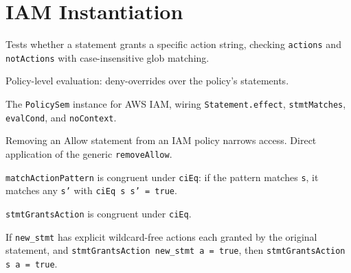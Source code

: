\section{IAM Instantiation}

\begin{definition}[stmtGrantsAction]\label{def:stmtGrantsAction}
\leanok
Tests whether a statement grants a specific action string, checking
\texttt{actions} and \texttt{notActions} with case-insensitive glob matching.
\end{definition}

\begin{definition}[allows]\label{def:allows}
\leanok
Policy-level evaluation: deny-overrides over the policy's statements.
\end{definition}

\begin{definition}[iamSem]\label{def:iamSem}
\leanok
The \texttt{PolicySem} instance for AWS IAM, wiring \texttt{Statement.effect},
\texttt{stmtMatches}, \texttt{evalCond}, and \texttt{noContext}.
\end{definition}

\begin{corollary}\label{cor:removeAllow_narrows}
\leanok
Removing an Allow statement from an IAM policy narrows access.
Direct application of the generic \texttt{removeAllow}.
\end{corollary}

\begin{theorem}\label{thm:matchPattern_ci_congr}
\leanok
\texttt{matchActionPattern} is congruent under \texttt{ciEq}:
if the pattern matches \texttt{s}, it matches any \texttt{s'}
with \texttt{ciEq s s' = true}.
\end{theorem}

\begin{theorem}\label{thm:stmtGrantsAction_ci_congr}
\leanok
\texttt{stmtGrantsAction} is congruent under \texttt{ciEq}.
\end{theorem}

\begin{theorem}\label{thm:stmtGrantsAction_narrow}
\leanok
If \texttt{new\_stmt} has explicit wildcard-free actions each granted
by the original statement, and \texttt{stmtGrantsAction new\_stmt a = true},
then \texttt{stmtGrantsAction s a = true}.
\end{theorem}

